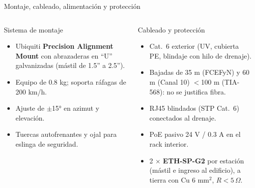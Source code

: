 \begin{frame}{Montaje, cableado, alimentación y protección}
  \begin{columns}[T]
    \begin{block}{Sistema de montaje}
      \small
      \begin{itemize}
        \item Ubiquiti \textbf{Precision Alignment Mount} con abrazaderas en ``U'' galvanizadas
              (mástil de 1.5'' a 2.5'').
        \item Equipo de 0.8 kg; soporta ráfagas de 200 km/h.
        \item Ajuste de $\pm$15° en azimut y elevación.
        \item Tuercas autofrenantes y ojal para eslinga de seguridad.
      \end{itemize}
    \end{block}
    \begin{block}{Cableado y protección}
      \small
      \begin{itemize}
        \item Cat.\ 6 exterior (UV, cubierta PE, blindaje con hilo de drenaje).
        \item Bajadas de 35 m (FCEFyN) y 60 m (Canal 10) $<$100 m (TIA-568): no se justifica fibra.
        \item RJ45 blindados (STP Cat.\ 6) conectados al drenaje.
        \item PoE pasivo 24 V / 0.3 A en el rack interior.
        \item 2 $\times$ \textbf{ETH-SP-G2} por estación (mástil e ingreso al edificio),
              a tierra con Cu 6 mm$^2$, $R<5\,\Omega$.
      \end{itemize}
    \end{block}
  \end{columns}
\end{frame}

